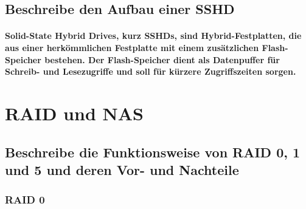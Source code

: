 \documentclass[a4paper]{article}
\begin{document}
    \subsection{\color{red} Beschreibe den Aufbau einer SSHD}\label{subsec:bescreibe-den-aufbau-einer-sshd}

    \paragraph{\color{codegreen}Solid-State Hybrid Drives, kurz SSHDs, sind Hybrid-Festplatten, die aus einer herkömmlichen Festplatte mit einem zusätzlichen Flash-Speicher bestehen. Der Flash-Speicher dient als Datenpuffer für Schreib- und Lesezugriffe und soll für kürzere Zugriffszeiten sorgen.}

    \section{RAID und NAS}\label{sec:raid-und-nas}
    \subsection{\color{red}Beschreibe die Funktionsweise von RAID 0, 1 und 5 und deren Vor- und Nachteile}\label{subsec:beschreibe-die-funktionsweise-von-raid-0-1-und-5}
    \subsubsection{\color{codegreen}RAID 0}
\end{document}
